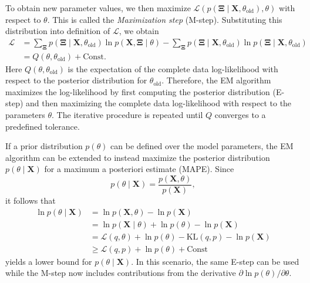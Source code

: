 To obtain new parameter values, we then maximize $\mathcal{L}\left( p\left(
    \mathbf{\Xi} \mid \mathbf{X}, \theta_{\text{old}} \right), \theta \right)$
with respect to $\theta$. This is called the \textit{Maximization step}
(M-step). Substituting this distribution into definition of $\mathcal{L}$, we obtain
\begin{align}
  \mathcal{L} &= \sum_{\mathbf{\Xi}}p\left( \mathbf{\Xi} \mid \mathbf{X}, \theta_{\text{old}}\right)\ln p\left( \mathbf{X}, \mathbf{\Xi}\mid \theta \right) - \sum_{\mathbf{\Xi}}p\left( \mathbf{\Xi}\mid \mathbf{X}, \theta_{\text{old}} \right)\ln p\left( \mathbf{\Xi} \mid \mathbf{X}, \theta_{\text{old}} \right) \\
  &= Q(\theta, \theta_{\text{old}}) + \text{Const}.
\end{align}
Here $Q(\theta, \theta_{\text{old}})$ is the expectation of the complete data
log-likelihood with respect to the posterior distribution for
$\theta_{\text{old}}$. Therefore, the EM algorithm maximizes the log-likelihood
by first computing the posterior distribution (E-step) and then maximizing the
complete data log-likelihood with respect to the parameters $\theta$. The
iterative procedure is repeated until $Q$ converges to a predefined tolerance.

If a prior distribution $p(\theta)$ can be defined over the model parameters,
the EM algorithm can be extended to instead maximize the posterior distribution
$p(\theta \mid \mathbf{X})$ for a maximum a posteriori estimate (MAPE). Since
\begin{equation}
  p(\theta \mid \mathbf{X}) = \frac{p(\mathbf{X}, \theta)}{p(\mathbf{X})},
\end{equation}
it follows that
\begin{align}
  \ln p\left( \theta \mid \mathbf{X} \right) &= \ln p\left( \mathbf{X},  \theta\right) - \ln p(\mathbf{X}) \\
                                             &= \ln p\left( \mathbf{X}\mid\theta \right) + \ln p(\theta) - \ln p(\mathbf{X}) \\
                                             &= \mathcal{L}(q, \theta) + \ln p(\theta) - \text{KL}(q,p) - \ln p(\mathbf{X}) \\
                                             &\geq \mathcal{L}(q,p) + \ln p(\theta) + \text{Const}
\end{align}
yields a lower bound for $p(\theta \mid \mathbf{X})$. In this scenario, the same E-step can be
used while the M-step now includes contributions from the derivative $\partial \ln p(\theta) /
\partial \theta$.


